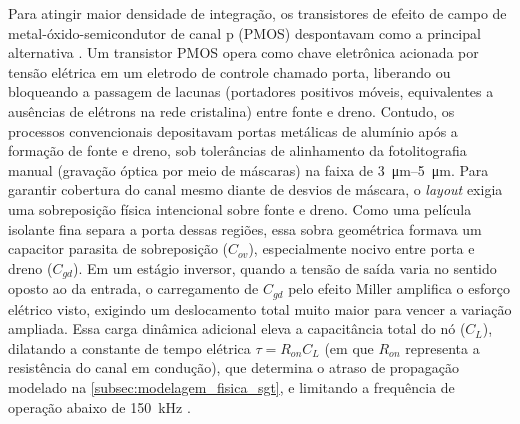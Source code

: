 Para atingir maior densidade de integração, os transistores de efeito de campo de metal-óxido-semicondutor de canal p (PMOS) despontavam como a principal alternativa \cite{mead1980, cavin2012}. Um transistor PMOS opera como chave eletrônica acionada por tensão elétrica em um eletrodo de controle chamado porta, liberando ou bloqueando a passagem de lacunas (portadores positivos móveis, equivalentes a ausências de elétrons na rede cristalina) entre fonte e dreno. Contudo, os processos convencionais depositavam portas metálicas de alumínio após a formação de fonte e dreno, sob tolerâncias de alinhamento da fotolitografia manual (gravação óptica por meio de máscaras) na faixa de \SIrange{3}{5}{\micro\meter}. Para garantir cobertura do canal mesmo diante de desvios de máscara, o \textit{layout} exigia uma sobreposição física intencional sobre fonte e dreno. Como uma película isolante fina separa a porta dessas regiões, essa sobra geométrica formava um capacitor parasita de sobreposição ($C_{ov}$), especialmente nocivo entre porta e dreno ($C_{gd}$). Em um estágio inversor, quando a tensão de saída varia no sentido oposto ao da entrada, o carregamento de $C_{gd}$ pelo efeito Miller amplifica o esforço elétrico visto, exigindo um deslocamento total muito maior para vencer a variação ampliada. Essa carga dinâmica adicional eleva a capacitância total do nó ($C_L$), dilatando a constante de tempo elétrica $\tau = R_{on} C_L$ (em que $R_{on}$ representa a resistência do canal em condução), que determina o atraso de propagação modelado na \cref{subsec:modelagem_fisica_sgt}, e limitando a frequência de operação abaixo de \SI{150}{\kilo\hertz} \cite{faggin1970, faggin1996}.

